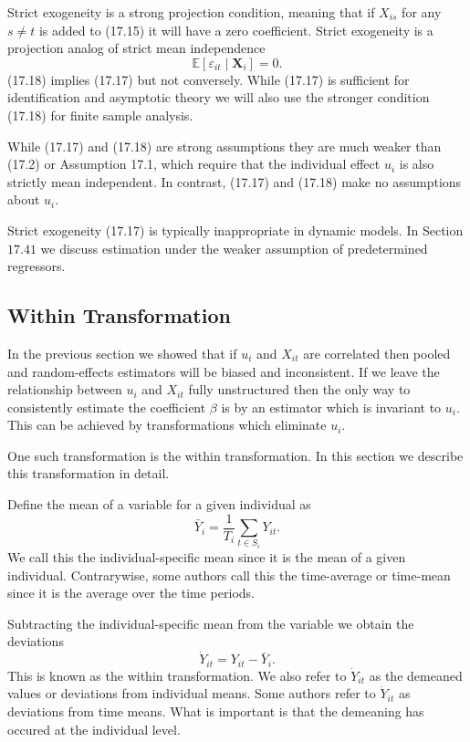 \documentclass[10pt]{article}
\begin{document}
Strict exogeneity is a strong projection condition, meaning that if $X_{i s}$ for any $s \neq t$ is added to (17.15) it will have a zero coefficient. Strict exogeneity is a projection analog of strict mean independence
$$
\mathbb{E}\left[\varepsilon_{i t} \mid \boldsymbol{X}_{i}\right]=0 .
$$
(17.18) implies (17.17) but not conversely. While (17.17) is sufficient for identification and asymptotic theory we will also use the stronger condition (17.18) for finite sample analysis.

While (17.17) and (17.18) are strong assumptions they are much weaker than (17.2) or Assumption 17.1, which require that the individual effect $u_{i}$ is also strictly mean independent. In contrast, (17.17) and (17.18) make no assumptions about $u_{i}$.

Strict exogeneity (17.17) is typically inappropriate in dynamic models. In Section $17.41$ we discuss estimation under the weaker assumption of predetermined regressors.

\subsection{Within Transformation}
In the previous section we showed that if $u_{i}$ and $X_{i t}$ are correlated then pooled and random-effects estimators will be biased and inconsistent. If we leave the relationship between $u_{i}$ and $X_{i t}$ fully unstructured then the only way to consistently estimate the coefficient $\beta$ is by an estimator which is invariant to $u_{i}$. This can be achieved by transformations which eliminate $u_{i}$.

One such transformation is the within transformation. In this section we describe this transformation in detail.

Define the mean of a variable for a given individual as
$$
\bar{Y}_{i}=\frac{1}{T_{i}} \sum_{t \in S_{i}} Y_{i t} .
$$
We call this the individual-specific mean since it is the mean of a given individual. Contrarywise, some authors call this the time-average or time-mean since it is the average over the time periods.

Subtracting the individual-specific mean from the variable we obtain the deviations
$$
\dot{Y}_{i t}=Y_{i t}-\bar{Y}_{i} .
$$
This is known as the within transformation. We also refer to $\dot{Y}_{i t}$ as the demeaned values or deviations from individual means. Some authors refer to $\dot{Y}_{i t}$ as deviations from time means. What is important is that the demeaning has occured at the individual level.
\end{document}
